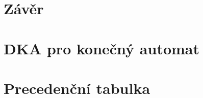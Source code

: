 \documentclass[a4paper, 11pt]{article}
\begin{document}
	\section{Závěr}
	
	\newpage
	
	\begingroup\centering
	\section*{DKA pro konečný automat}
	\endgroup
	\vspace{1.8cm}
	\begin{figure}[h]
		\centering
		\hspace*{-1.2cm}
		\label{DKA}
	\end{figure}
	\newpage

	\begingroup\centering
	\section*{Precedenční tabulka}
	\endgroup
	\vspace{1.8cm}
	\begin{figure}[h]
		\centering
		\hspace*{-2cm}
		\label{prec_table}
	\end{figure}
	\newpage
	
\end{document}
